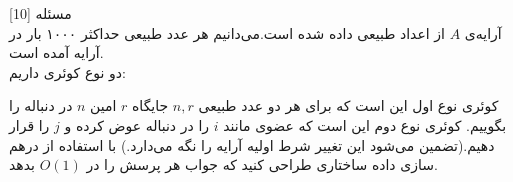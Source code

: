 ‌مسئله [10]
\\
آرایه‌ی $A$ از اعداد طبیعی داده شده است.می‌دانیم هر عدد طبیعی حداکثر ۱۰۰۰ بار در آرایه آمده است.\\
دو نوع کوئری داریم:

  کوئری نوع اول این است که برای هر دو عدد طبیعی $n,r$ جایگاه $r$ امین $n$ در دنباله را بگوییم.
  کوئری نوع دوم این است که عضوی مانند $i$ را در دنباله عوض کرده و $j$ را قرار دهیم.(تضمین می‌شود این تغییر شرط اولیه آرایه را نگه می‌دارد.)
با استفاده از درهم سازی داده ساختاری طراحی کنید که جواب هر پرسش را در $O(1)$ بدهد.





% 
%
%
% 



